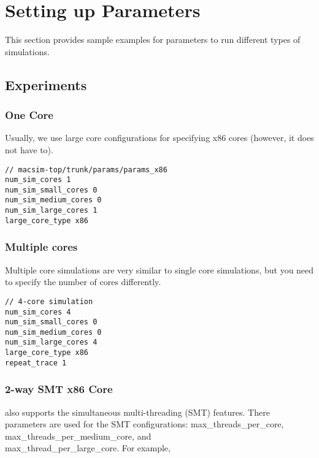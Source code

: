 
\clearpage
\section{Setting up Parameters}
\label{sec:parameter}

This section provides sample examples for parameters to run different
types of simulations.



\subsection{\cpu Experiments}

\subsubsection{One \cpu Core}

Usually, we use large core configurations for specifying x86 cores
(however, it does not have to).

\smallskip
\begin{lstlisting}
// macsim-top/trunk/params/params_x86
num_sim_cores 1
num_sim_small_cores 0
num_sim_medium_cores 0
num_sim_large_cores 1
large_core_type x86
\end{lstlisting}
\smallskip

\subsubsection{Multiple \cpu cores}

Multiple core simulations are very similar to single core simulations,
but you need to specify the number of cores differently.

\smallskip
\begin{lstlisting}
// 4-core simulation
num_sim_cores 4
num_sim_small_cores 0
num_sim_medium_cores 0
num_sim_large_cores 4
large_core_type x86
repeat_trace 1
\end{lstlisting}
\smallskip


\subsubsection{2-way SMT x86 Core}

\SIM also supports the simultaneous multi-threading (SMT) features. 
There parameters are used for the SMT configurations: 
\textsf{max\_threads\_per\_core}, \textsf{max\_threads\_per\_medium\_core}, 
and \\\textsf{max\_thread\_per\_large\_core}. For example,

